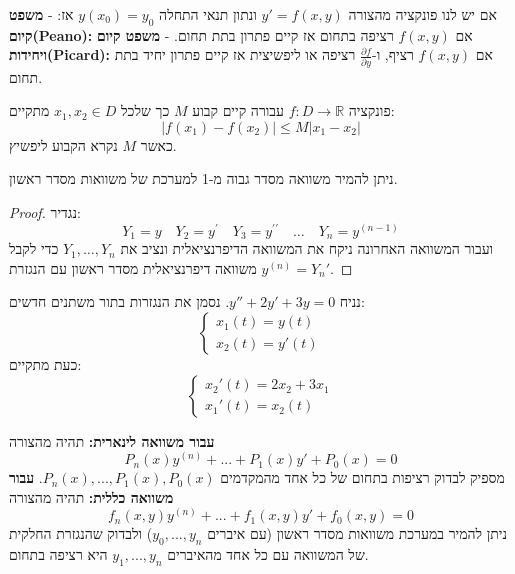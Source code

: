 \documentclass{tstextbook}
\begin{document}
\begin{theorem}
אם יש לנו פונקציה מהצורה \(y'=f(x,y)\) ונתון תנאי התחלה \(y(x_0)=y_0\) אז:
- \textbf{משפט קיום(Peano):}
אם \(f(x,y)\) רציפה בתחום אז קיים פתרון בתת תחום.
- \textbf{משפט קיום ויחידות(Picard):}
אם \(f(x,y)\) רציף, ו-\(\frac{\partial f}{\partial y}\) רציפה או ליפשיצית אז קיים פתרון יחיד בתת תחום.

\end{theorem}
\begin{reminder}
פונקציה \(f:D\to \mathbb{R}\) עבורה קיים קבוע \(M\) כך שלכל \(x_{1},x_{2} \in D\) מתקיים:
$$\lvert f(x_{1})-f(x_{2}) \rvert \leq M|x_{1}-x_{2}|$$
כאשר \(M\) נקרא הקבוע ליפשיץ.

\end{reminder}
\begin{proposition}
ניתן להמיר משוואה מסדר גבוה מ-1 למערכת של משוואות מסדר ראשון.

\end{proposition}
\begin{proof}
נגדיר:
$${{Y_{1}=y}}\quad  {{Y_{2}=y^{\prime}}}\quad  {{Y_{3}=y^{\prime\prime}}}\quad  {{\dots}}\quad  {{Y_{n}=y^{(n-1)}}}$$
ועבור המשוואה האחרונה ניקח את המשוואה הדיפרנציאלית ונציב את \(Y_{1},\dots,Y_{n}\) כדי לקבל משוואה דיפרנציאלית מסדר ראשון עם הנגזרת \(y^{(n)}=Y_{n}'\).

\end{proof}
\begin{example}
נניח \(y'' + 2y' + 3y=0\). נסמן את הנגזרות בתור משתנים חדשים:
$$\begin{cases}x_1(t) = y(t) \\ x_2(t)=y'(t)\end{cases}$$
כעת מתקיים:
$$\begin{cases}x_2'(t) = 2x_2 + 3 x_1 \\ x_1'(t) = x_2(t)
\end{cases}$$

\end{example}
\begin{theorem}
\textbf{עבור משוואה לינארית:} תהיה מהצורה
$$P_n(x) y^{(n)} +...+P_1(x)y'+P_0 (x) =0$$
מספיק לבדוק רציפות בתחום של כל אחד מהמקדמים \(P_n(x),...,P_1(x),P_0(x)\).
 \textbf{עבור משוואה כללית:} תהיה מהצורה
$$f_n(x,y) y^{(n)} +...+f_1(x,y)y'+f_0(x,y) =0$$
ניתן להמיר במערכת משוואות מסדר ראשון (עם איברים \(y_0, ..., y_n\)) ולבדוק שהנגזרת החלקית של המשוואה עם 
כל אחד מהאיברים \(y_1,...,y_n\) היא רציפה בתחום.

\end{theorem}
\end{document}

